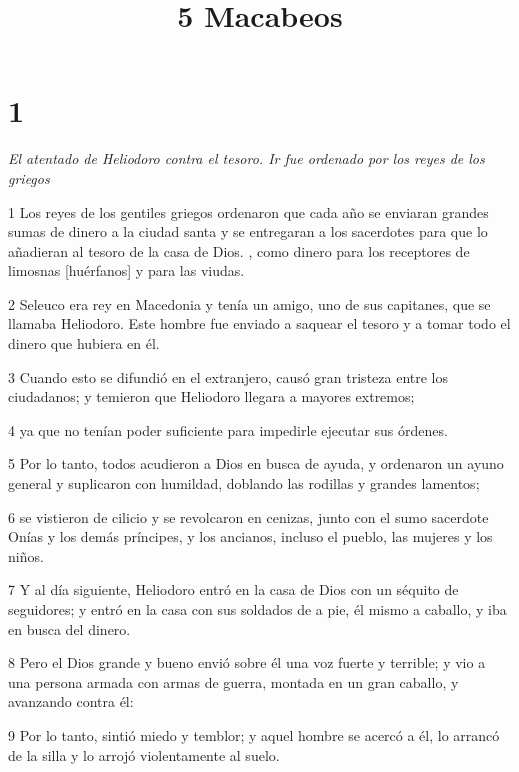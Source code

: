 

\title{5 Macabeos}


\chapter{1}

\par \textit {El atentado de Heliodoro contra el tesoro. Ir fue ordenado por los reyes de los griegos}

\par 1 Los reyes de los gentiles griegos ordenaron que cada año se enviaran grandes sumas de dinero a la ciudad santa y se entregaran a los sacerdotes para que lo añadieran al tesoro de la casa de Dios. , como dinero para los receptores de limosnas [huérfanos] y para las viudas.

\par 2 Seleuco era rey en Macedonia y tenía un amigo, uno de sus capitanes, que se llamaba Heliodoro. Este hombre fue enviado a saquear el tesoro y a tomar todo el dinero que hubiera en él.

\par 3 Cuando esto se difundió en el extranjero, causó gran tristeza entre los ciudadanos; y temieron que Heliodoro llegara a mayores extremos;

\par 4 ya que no tenían poder suficiente para impedirle ejecutar sus órdenes.

\par 5 Por lo tanto, todos acudieron a Dios en busca de ayuda, y ordenaron un ayuno general y suplicaron con humildad, doblando las rodillas y grandes lamentos;

\par 6 se vistieron de cilicio y se revolcaron en cenizas, junto con el sumo sacerdote Onías y los demás príncipes, y los ancianos, incluso el pueblo, las mujeres y los niños.

\par 7 Y al día siguiente, Heliodoro entró en la casa de Dios con un séquito de seguidores; y entró en la casa con sus soldados de a pie, él mismo a caballo, y iba en busca del dinero.

\par 8 Pero el Dios grande y bueno envió sobre él una voz fuerte y terrible; y vio a una persona armada con armas de guerra, montada en un gran caballo, y avanzando contra él:

\par 9 Por lo tanto, sintió miedo y temblor; y aquel hombre se acercó a él, lo arrancó de la silla y lo arrojó violentamente al suelo.

